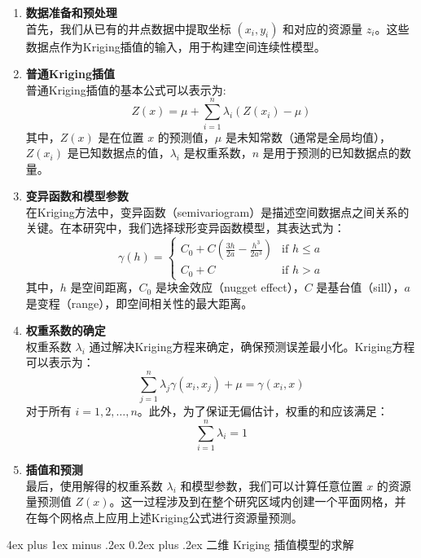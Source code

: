 \documentclass[12pt,a4paper]{nmmcm}
\makeatletter
\renewcommand\subsubsection{\@startsection{subsubsection}{3}{1em}%
  {4ex plus 1ex minus .2ex}%
  {0.2ex plus .2ex}%
  {\normalfont\large\bfseries}}
\makeatother
\begin{document}
\begin{enumerate}
  \item \textbf{数据准备和预处理} \\
        首先，我们从已有的井点数据中提取坐标 $(x_i, y_i)$ 和对应的资源量 $z_i$。这些数据点作为Kriging插值的输入，用于构建空间连续性模型。

  \item \textbf{普通Kriging插值} \\
        普通Kriging插值的基本公式可以表示为:
        \[
          Z(x) = \mu + \sum_{i=1}^n \lambda_i (Z(x_i) - \mu)
        \]
        其中，$Z(x)$ 是在位置 $x$ 的预测值，$\mu$ 是未知常数（通常是全局均值），$Z(x_i)$ 是已知数据点的值，$\lambda_i$ 是权重系数，$n$ 是用于预测的已知数据点的数量。

  \item \textbf{变异函数和模型参数} \\
        在Kriging方法中，变异函数（semivariogram）是描述空间数据点之间关系的关键。在本研究中，我们选择球形变异函数模型，其表达式为：
        \[
          \gamma(h) =
          \begin{cases}
            C_0 + C \left( \frac{3h}{2a} - \frac{h^3}{2a^3} \right) & \text{if } h \leq a \\
            C_0 + C                                                 & \text{if } h > a
          \end{cases}
        \]
        其中，$h$ 是空间距离，$C_0$ 是块金效应（nugget effect），$C$ 是基台值（sill），$a$ 是变程（range），即空间相关性的最大距离。

  \item \textbf{权重系数的确定} \\
        权重系数 $\lambda_i$ 通过解决Kriging方程来确定，确保预测误差最小化。Kriging方程可以表示为：
        \[
          \sum_{j=1}^n \lambda_j \gamma(x_i, x_j) + \mu = \gamma(x_i, x)
        \]
        对于所有 $i = 1, 2, \ldots, n$。此外，为了保证无偏估计，权重的和应该满足：
        \[
          \sum_{i=1}^n \lambda_i = 1
        \]

  \item \textbf{插值和预测} \\
        最后，使用解得的权重系数 $\lambda_i$ 和模型参数，我们可以计算任意位置 $x$ 的资源量预测值 $Z(x)$。这一过程涉及到在整个研究区域内创建一个平面网格，并在每个网格点上应用上述Kriging公式进行资源量预测。
\end{enumerate}

\pagebreak

\subsubsection{二维 Kriging 插值模型的求解}
\end{document}
